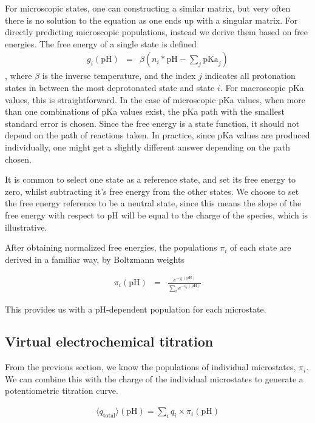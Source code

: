 \documentclass[9pt,lineno,final]{elife}
\newcommand{\pH}{\mathrm{pH}}
\newcommand{\pKa}{\mathrm{pKa}}
\begin{document}
For microscopic states, one can constructing a similar matrix, but very often there is no solution to the equation as one ends up with a singular matrix. 
%
For directly predicting microscopic populations, instead we derive them based on free energies. 
%
The free energy of a single state is defined 
\begin{eqnarray}
	g_i(\pH) &=& \beta \left( n_i*\pH - \sum_j \pKa_j \right) \label{eq:pkatodg}
\end{eqnarray}
%
, where $\beta$ is the inverse temperature, and the index $j$ indicates all protonation states in between the most deprotonated state and state $i$. 
%
For macroscopic pKa values, this is straightforward.
%
In the case of microscopic pKa values, when more than one combinations of pKa values exist, the pKa path with the smallest standard error is chosen.
%
Since the free energy is a state function, it should not depend on the path of reactions taken.
%
In practice, since pKa values are produced individually, one might get a slightly different answer depending on the path chosen.
%

It is common to select one state as a reference state, and set its free energy to zero, whilst subtracting it's free energy from the other states.
%
We choose to set the free energy reference to be a neutral state, since this means the slope of the free energy with respect to pH will be equal to the charge of the species, which is illustrative.

After obtaining normalized free energies, the populations $\pi_i$ of each state are derived in a familiar way, by Boltzmann weights

\begin{eqnarray}
	\pi_i(\pH) &=& \frac{e^{-g_i(\pH)}}{\sum_i e^{-g_i(\pH)} } \label{eq:dgtopi}
\end{eqnarray}

This provides us with a pH-dependent population for each microstate.


\subsection{Virtual electrochemical titration}

From the previous section, we know the populations of individual microstates, $\pi_i$. 
%
We can combine this with the charge of the individual microstates to generate a potentiometric titration curve.
%


\begin{eqnarray}
	\langle q_\text{total} \rangle (\pH) = \sum_i q_i \times \pi_i(\pH) 
\end{eqnarray}
\end{document}
